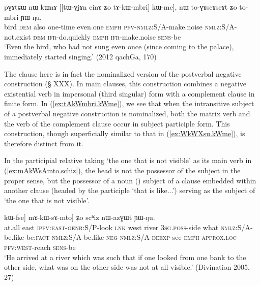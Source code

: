 \begin{exe}
\ex \label{ex:tAkWmbri.kWme}
 \gll  pɣɤtɕɯ nɯ kɯnɤ [[tɯ-ɣjɤn cinɤ ʑo tɤ-kɯ-mbri] kɯ-me], nɯ to-ɣɤscɤscɤt ʑo to-mbri ɲɯ-ŋu, \\
bird \textsc{dem} also one-time even.one \textsc{emph} \textsc{pfv}-\textsc{nmlz}:S/A-make.noise \textsc{nmlz}:S/A-not.exist \textsc{dem} \textsc{ifr}-do.quickly \textsc{emph} \textsc{ifr}-make.noise \textsc{sens}-be \\
\glt `Even the bird, who had not sung even once (since coming to the palace), immediately started singing.' (2012 qachGa, 170)
 \end{exe}

The clause  here is in fact the nominalized version of the postverbal negative construction  (§ XXX). In main clauses, this construction combines a negative existential verb in impersonal (third singular) form with a complement clause in finite form. In (\ref{ex:tAkWmbri.kWme}), we see that when the intransitive subject of a postverbal negative construction is nominalized, both the matrix verb  and the verb of the complement clause  occur in subject participle form. This construction, though superficially similar to that in (\ref{ex:WkWXsu.kWme}), is therefore distinct from it.


 In the participial relative taking  `the one that is not visible' as its main verb in (\ref{ex:mAkWsAmto.schiz}), the head  is not the possessor of the subject in the proper sense, but the possessor of a noun () subject of a clause embedded within another clause (headed by the participle  `that is like...') serving as the subject of  `the one that is not visible'.  

  \begin{exe}
\ex \label{ex:mAkWsAmto.schiz}
 \gll  [maka tɕɤkɯ ku-kɯ-ru tɕe tɕɤndi smar [[ɯ-βzɯr tɕʰi kɯ-fse ŋu] kɯ-fse] mɤ-kɯ-sɤ-mto] ʑo scʰiz nɯ-azɣɯt ɲɯ-ŋu. \\
 at.all east \textsc{ipfv}:\textsc{east}-\textsc{genr}:S/P-look \textsc{lnk} west river \textsc{3sg}.\textsc{poss}-side what \textsc{nmlz}:S/A-be.like be:\textsc{fact} \textsc{nmlz}:S/A-be.like \textsc{neg}-\textsc{nmlz}:S/A-\textsc{deexp}-see \textsc{emph} \textsc{approx}.\textsc{loc} \textsc{pfv}:\textsc{west}-reach \textsc{sens}-be \\
\glt `He arrived at a river which was such that if one looked from one bank to the other side, what was on the other side was not at all visible.' (Divination 2005, 27)
 \end{exe}
 
